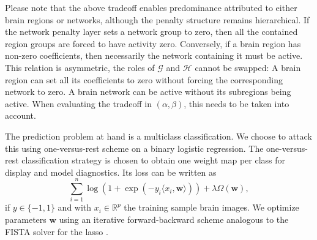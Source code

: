 \documentclass[runningheads,a4paper]{llncs}
\begin{document}
Please note that the above tradeoff enables predominance
attributed to either brain regions or networks, although the
penalty structure remains hierarchical.
If the network penalty layer sets a
network group to zero, then all the contained region groups are forced to
have activity zero. Conversely, if a brain region has non-zero coefficients,
then necessarily the network containing it must be active.
This relation is asymmetric, the roles of \(\mathcal G\) and \(\mathcal H\) 
cannot be swapped: A brain 
region can set all its coefficients to zero without forcing the 
corresponding network to zero. A brain network can be active without its
subregions being active.
When evaluating the tradeoff in \((\alpha, \beta)\), this needs to be taken
into account.

The prediction problem at hand is a multiclass classification. We choose to
attack this using one-versus-rest scheme on a binary logistic regression.
The one-versus-rest classification strategy is
chosen to obtain one weight map per class for display and model diagnostics.
Its loss can be written as
\[\sum_{i=1}^n\log(1 + \exp(-y_i\langle x_i, \mathbf{w}\rangle)) + \lambda\Omega(\mathbf{w}),\]
if \(y\in\{-1, 1\}\) and with \(x_i\in\mathbb{R}^p\) the training sample brain images.
We optimize parameters \(\mathbf{w}\) using an iterative forward-backward
scheme analogous to the FISTA solver for the lasso \cite{beck2009}.
\end{document}
